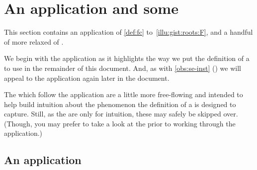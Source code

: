 \section{An application and some }

\begin{note}
  This section contains an application of \autoref{def:fc} to~\autoref{illu:gist:roots:F}, and a handful of more relaxed  of .

  We begin with the application as it highlights the way we put the definition of a \fc{} to use in the remainder of this document.
  And, as with \autoref{obs:se-inst} () we will appeal to the application again later in the document.

  The  which follow the application are a little more free-flowing and intended to help build intuition about the phenomenon the definition of a \fc{} is designed to capture.
  Still, as the  are only for intuition, these may safely be skipped over.
  (Though, you may prefer to take a look at the  prior to working through the application.)
\end{note}


\subsection{An application}

